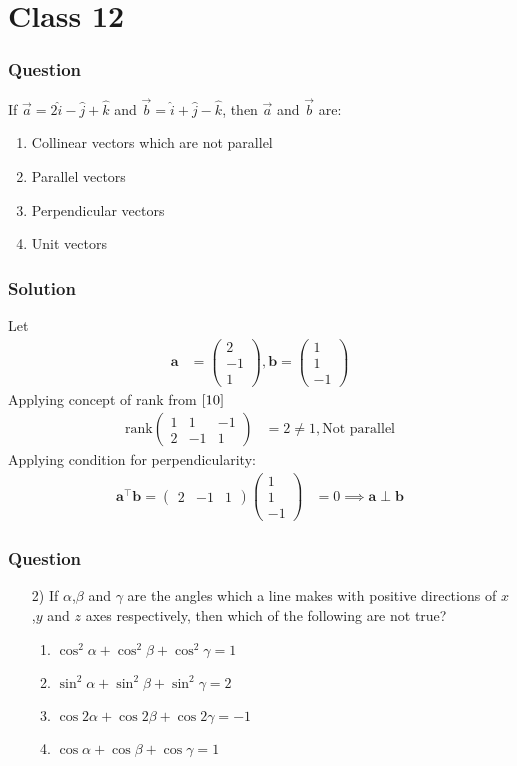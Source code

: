 \documentclass{beamer}
\theoremstyle{remark}
\newcommand{\myvec}[1]{\ensuremath{\begin{pmatrix}#1\end{pmatrix}}}
\let\vec\mathbf
\begin{document}
\section{Class 12}
%
\begin{frame}
\frametitle{Question }
If $\overrightarrow{a} = 2\hat{i} - \hat{j} + \hat{k}$ and  $\overrightarrow{b} = \hat{i} + \hat{j} - \hat{k}$, then $\overrightarrow{a}$ and $\overrightarrow{b}$ are:
    \begin{enumerate}
\item  Collinear vectors which are not parallel
\item  Parallel vectors
\item  Perpendicular vectors
\item  Unit vectors
\end{enumerate}
\end{frame}
%
\begin{frame}
\frametitle{Solution}
Let
\begin{align}
    \vec{a} &= \myvec{
        2\\
        -1\\
        1
    } , 
    \vec{b}=\myvec{
        1\\
        1\\
        -1
    }
    \end{align}
    Applying concept of rank from $\eqref{10}$
    \begin{align}
                  \text{rank}\myvec{
        1 & 1 & -1\\
        2 & -1 & 1
    } &=2 \neq 1 ,
    \text{Not parallel}
    \end{align}
    Applying condition for perpendicularity:
    \begin{align}
            \vec{a}^{\top}\vec{b} = \myvec{
        2 &-1 &1
    }\myvec{
        1\\
        1\\
        -1
    } &= 0
    \implies \vec{a} \perp \vec{b}
\end{align}
\end{frame}
%
\begin{frame}
\frametitle{Question }
\begin{enumerate}
    \item [2)]
If $\alpha$,$\beta$ and $\gamma$ are the angles which a line makes with positive directions of $x$,$y$ and $z$ axes respectively, then which of the following are {not} true?
    \begin{enumerate}
\item  $\cos^2{\alpha} + \cos^2{\beta} + \cos^2{\gamma} = 1$
\item  $\sin^2{\alpha} + \sin^2{\beta} + \sin^2{\gamma} = 2$
\item  $\cos{2\alpha} + \cos{2\beta} + \cos{2\gamma} =-1$
\item  $\cos{\alpha} + \cos{\beta} + \cos{\gamma} = 1$
\end{enumerate}
\end{enumerate}
\end{frame}
\end{document}
